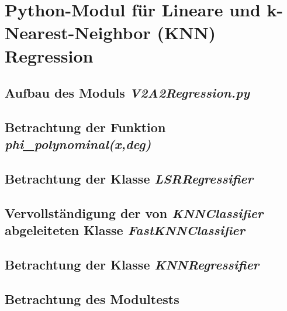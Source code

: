 \section{Python-Modul für Lineare und k-Nearest-Neighbor (KNN) Regression}


\subsection{
    Aufbau des Moduls \textit{V2A2\textunderscore Regression.py}
}

\subsection{
    Betrachtung der Funktion \textit{phi_polynominal(x,deg)}
}

\subsection{
    Betrachtung der Klasse \textit{LSRRegressifier}
}

\subsection{
    Vervollständigung der von \textit{KNNClassifier} abgeleiteten Klasse \textit{FastKNNClassifier}
}

\subsection{
    Betrachtung der Klasse \textit{KNNRegressifier}
}

\subsection{
    Betrachtung des Modultests
}
